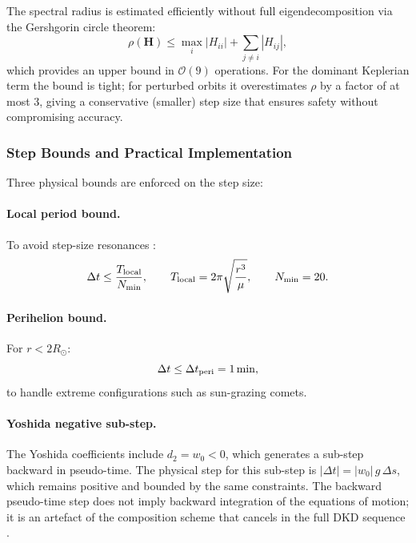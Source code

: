 The spectral radius is estimated efficiently without full
eigendecomposition via the Gershgorin circle theorem:
\begin{equation}
  \rho(\mathbf{H}) \leq \max_i
  \left|H_{ii}\right| + \sum_{j\neq i} |H_{ij}|,
  \label{eq:gershgorin}
\end{equation}
which provides an upper bound in $\mathcal{O}(9)$ operations.
For the dominant Keplerian term the bound is tight;
for perturbed orbits it overestimates $\rho$ by a factor
of at most 3, giving a conservative (smaller) step size
that ensures safety without compromising accuracy.

\subsubsection{Step Bounds and Practical Implementation}
\label{sec:step_bounds}

Three physical bounds are enforced on the step size:

\paragraph{Local period bound.}
To avoid step-size resonances \citep{HernandezZeebeHadden2022}:
\begin{equation}
  \Delta t \leq \frac{T_{\rm local}}{N_{\rm min}},
  \qquad
  T_{\rm local} = 2\pi\sqrt{\frac{r^3}{\mu}},
  \qquad
  N_{\rm min} = 20.
  \label{eq:period_bound}
\end{equation}

\paragraph{Perihelion bound.}
For $r < 2R_\odot$:
\begin{equation}
  \Delta t \leq \Delta t_{\rm peri} = 1\,\mathrm{min},
  \label{eq:perihelion_bound}
\end{equation}
to handle extreme configurations such as sun-grazing comets.

\paragraph{Yoshida negative sub-step.}
The Yoshida coefficients include $d_2 = w_0 < 0$, which
generates a sub-step backward in pseudo-time. The physical
step for this sub-step is $|\Delta t| = |w_0|\,g\,\Delta s$,
which remains positive and bounded by the same constraints.
The backward pseudo-time step does not imply backward
integration of the equations of motion; it is an artefact of
the composition scheme that cancels in the full DKD sequence
\citep{Yoshida1990}.
